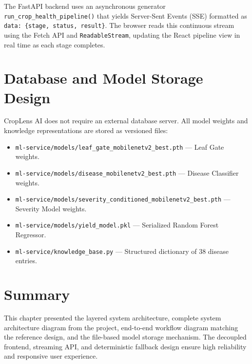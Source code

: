The FastAPI backend uses an asynchronous generator \texttt{run\_crop\_health\_pipeline()} that yields Server-Sent Events (SSE) formatted as \texttt{data: \{stage, status, result\}}. The browser reads this continuous stream using the Fetch API and \texttt{ReadableStream}, updating the React pipeline view in real time as each stage completes.

\section{Database and Model Storage Design}

CropLens AI does not require an external database server. All model weights and knowledge representations are stored as versioned files:
\begin{itemize}
    \item \texttt{ml-service/models/leaf\_gate\_mobilenetv2\_best.pth} --- Leaf Gate weights.
    \item \texttt{ml-service/models/disease\_mobilenetv2\_best.pth} --- Disease Classifier weights.
    \item \texttt{ml-service/models/severity\_conditioned\_mobilenetv2\_best.pth} --- Severity Model weights.
    \item \texttt{ml-service/models/yield\_model.pkl} --- Serialized Random Forest Regressor.
    \item \texttt{ml-service/knowledge\_base.py} --- Structured dictionary of 38 disease entries.
\end{itemize}

\section{Summary}

This chapter presented the layered system architecture, complete system architecture diagram from the project, end-to-end workflow diagram matching the reference design, and the file-based model storage mechanism. The decoupled frontend, streaming API, and deterministic fallback design ensure high reliability and responsive user experience.

